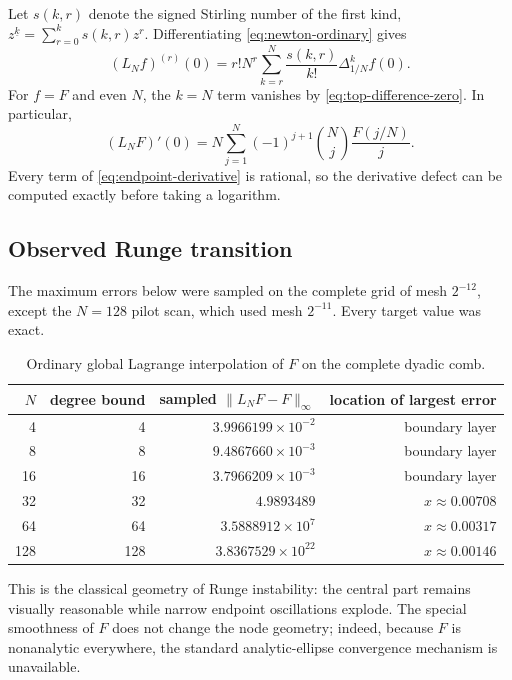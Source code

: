 \documentclass[11pt,oneside]{article}
\numberwithin{equation}{section}
\theoremstyle{definition}
\theoremstyle{remark}
\newcommand{\fall}[2]{#1^{\underline{#2}}}
\begin{document}
Let $s(k,r)$ denote the signed Stirling number of the first kind,
$\fall{z}{k}=\sum_{r=0}^{k}s(k,r)z^r$.  Differentiating
\eqref{eq:newton-ordinary} gives
\begin{equation}
 (L_Nf)^{(r)}(0)
 =r!N^r\sum_{k=r}^{N}\frac{s(k,r)}{k!}\Delta_{1/N}^{k}f(0).
 \label{eq:stirling-endpoint}
\end{equation}
For $f=F$ and even $N$, the $k=N$ term vanishes by
\eqref{eq:top-difference-zero}.  In particular,
\begin{equation}
 (L_NF)'(0)=
 N\sum_{j=1}^{N}(-1)^{j+1}\binom Nj\frac{F(j/N)}{j}.
 \label{eq:endpoint-derivative}
\end{equation}
Every term of \eqref{eq:endpoint-derivative} is rational, so the derivative defect can be
computed exactly before taking a logarithm.

\subsection{Observed Runge transition}

The maximum errors below were sampled on the complete grid of mesh $2^{-12}$, except the
$N=128$ pilot scan, which used mesh $2^{-11}$.  Every target value was exact.

\begin{table}[htbp]
\centering
\caption{Ordinary global Lagrange interpolation of $F$ on the complete dyadic comb.}
\label{tab:ordinary-errors}
\begin{tabular}{rrrr}
\toprule
$N$ & degree bound & sampled $\lVert L_NF-F\rVert_\infty$ & location of largest error \\
\midrule
4   & 4   & $3.9966199\times10^{-2}$ & boundary layer \\
8   & 8   & $9.4867660\times10^{-3}$ & boundary layer \\
16  & 16  & $3.7966209\times10^{-3}$ & boundary layer \\
32  & 32  & $4.9893489$               & $x\approx0.00708$ \\
64  & 64  & $3.5888912\times10^{7}$  & $x\approx0.00317$ \\
128 & 128 & $3.8367529\times10^{22}$ & $x\approx0.00146$ \\
\bottomrule
\end{tabular}
\end{table}

This is the classical geometry of Runge instability: the central part remains visually
reasonable while narrow endpoint oscillations explode.  The special smoothness of $F$ does
not change the node geometry; indeed, because $F$ is nonanalytic everywhere, the standard
analytic-ellipse convergence mechanism is unavailable.
\end{document}
